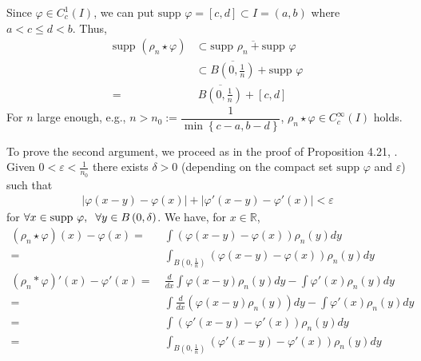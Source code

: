 \documentclass[a4paper,oneside]{article}
\numberwithin{equation}{section}
\begin{document}
Since $\varphi  \in C_c^1\left( I \right)$, we can put $\mbox{supp }\varphi  = \left[ {c,d} \right] \subset I = \left( {a,b} \right)$ where $a <c\le d<b$. Thus,
\begin{align}
\mbox{supp }\left( {{\rho _n}\star \varphi } \right) &\subset \overline {\mbox{supp }{\rho _n} + \mbox{supp }\varphi } \\
& \subset \overline {B\left( {0,\frac{1}{n}} \right)}  + \mbox{supp }\varphi \\
=&\ \overline {B\left( {0,\frac{1}{n}} \right)}  + \left[ {c,d} \right]
\end{align}
For $n$ large enough, e.g., $n > n_0:=\dfrac{1}{{\min \left\{ {c - a,b - d} \right\}}}$, ${\rho _n}\star \varphi  \in C_c^\infty \left( I \right)$ holds. 

To prove the second argument, we proceed as in the proof of Proposition 4.21, \cite{1}. Given $0 < \varepsilon  < \frac{1}{{{n_0}}}$ there exists $\delta >0$ (depending on the compact set $\mbox{supp }\varphi$ and $\varepsilon$) such that
\begin{align}
\label{1.16}
\left| {\varphi \left( {x - y} \right) - \varphi \left( x \right)} \right| + \left| {\varphi '\left( {x - y} \right) - \varphi '\left( x \right)} \right| < \varepsilon 
\end{align}
for $\forall x \in \mbox{supp }\varphi ,\hspace{0.2cm}\forall y \in B\left( {0,\delta } \right)$. We have, for $x\in \mathbb{R}$,
\begin{align}
\left( {{\rho _n}\star \varphi } \right)\left( x \right) - \varphi \left( x \right) =&\ \int {\left( {\varphi \left( {x - y} \right) - \varphi \left( x \right)} \right){\rho _n}\left( y \right)dy} \\
 =&\ \int_{B\left( {0,\frac{1}{n}} \right)} {\left( {\varphi \left( {x - y} \right) - \varphi \left( x \right)} \right){\rho _n}\left( y \right)dy} \\
\left( {{\rho _n}*\varphi } \right)'\left( x \right) - \varphi '\left( x \right) =&\ \frac{d}{{dx}}\int {\varphi \left( {x - y} \right){\rho _n}\left( y \right)dy}  - \int {\varphi '\left( x \right){\rho _n}\left( y \right)dy} \\
=&\ \int {\frac{d}{{dx}}\left( {\varphi \left( {x - y} \right){\rho _n}\left( y \right)} \right)dy}  - \int {\varphi '\left( x \right){\rho _n}\left( y \right)dy}\\
=&\ \int {\left( {\varphi '\left( {x - y} \right) - \varphi '\left( x \right)} \right){\rho _n}\left( y \right)dy} \\
=&\ \int_{B\left( {0,\frac{1}{n}} \right)} {\left( {\varphi '\left( {x - y} \right) - \varphi '\left( x \right)} \right){\rho _n}\left( y \right)dy} 
\end{align}
\end{document}
